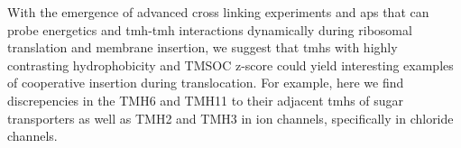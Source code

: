 With the emergence of advanced cross linking experiments and \gls{ap}s that can probe energetics and \gls{tmh}\--\gls{tmh} interactions dynamically during ribosomal translation and membrane insertion, we suggest that \gls{tmh}s with highly contrasting hydrophobicity and TMSOC z-score could yield interesting examples of cooperative insertion during translocation.
For example, here we find discrepencies in the TMH6 and TMH11 to their adjacent \gls{tmh}s of sugar transporters as well as TMH2 and TMH3 in ion channels, specifically in chloride channels.

